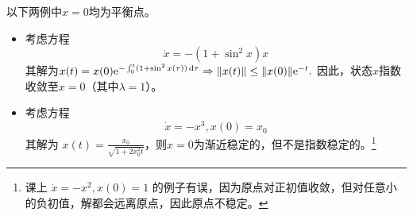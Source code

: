\begin{example}[稳定与不稳定的计算例]
  以下两例中$x=0$均为平衡点。\begin{itemize}[leftmargin=1em]
    \item 考虑方程$$\dot{x}=-(1+\sin^2x)x$$
其解为$x(t)=x(0)\mathrm{e}^{-\int_{0}^{t}(1+\sin^{2}x(\tau))\mathop{}\!\mathrm{d}\tau}\Rightarrow\|x(t)\|\leq\|x(0)\|\mathrm{e}^{-t}.$
因此，状态$x$指数收敛至$x=0$（其中$\lambda=1$）。
\item 考虑方程$$\dot{x}=-x^3,x(0)=x_0$$
其解为 $x(t)=\frac{x_0}{\sqrt{1+2x_0^2t}}$，则$x=0$为渐近稳定的，但不是指数稳定的。\footnote{课上 $\dot{x}=-x^2,x(0)=1$ 的例子有误，因为原点对正初值收敛，但对任意小的负初值，解都会远离原点，因此原点不稳定。}
  \end{itemize}
\end{example}
